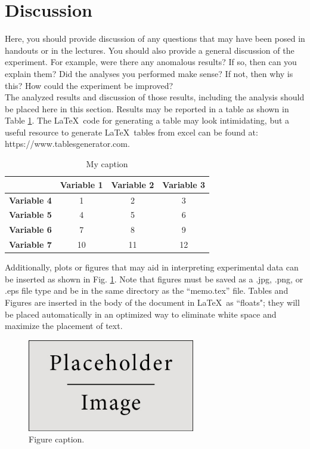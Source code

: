 \documentclass[12pt,letterpaper]{article}       %
\begin{document}
\section{Discussion}

Here, you should provide discussion of any questions that may have been posed in handouts or in the lectures. You should also provide a general discussion of the experiment. For example, were there any anomalous results? If so, then can you explain them? Did the analyses you performed make sense? If not, then why is this? How could the experiment be improved?\\ 

The analyzed results and discussion of those results, including the analysis should be placed here in this section. Results may be reported in a table as shown in Table \ref{table_lable}.  The \LaTeX\ code for generating a table may look intimidating, but a useful resource to generate \LaTeX\ tables from excel can be found at: https://www.tablesgenerator.com.
\begin{table}[h]
\centering
\caption{My caption}
\label{table_lable}
\begin{tabular}{c|ccc}
  & \textbf{Variable 1} & \textbf{Variable 2} & \textbf{Variable 3} \\
 \hline
\textbf{Variable 4} & 1 & 2 & 3 \\
\textbf{Variable 5} & 4 & 5 & 6 \\
\textbf{Variable 6} & 7 & 8 & 9 \\
\textbf{Variable 7} & 10 & 11 & 12
\end{tabular}
\end{table}
Additionally, plots or figures that may aid in interpreting experimental data can be inserted as shown in Fig. \ref{placeholderFigure}. Note that figures must be saved as a .jpg, .png, or .eps file type and be in the same directory as the ``memo.tex'' file.  Tables and Figures are inserted in the body of the document in \LaTeX\ as ``floats"; they will be placed automatically in an optimized way to eliminate white space and maximize the placement of text.
\begin{figure}[h]
\begin{center}
	\includegraphics[width=0.65\textwidth]{placeholder} %
	\caption{Figure caption.}
	\label{placeholderFigure}
\end{center}
\end{figure}	
\end{document}
